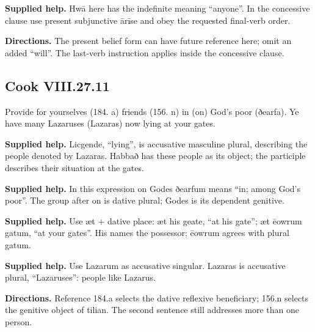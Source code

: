 \textbf{Supplied help.} Hwā here has the indefinite meaning “anyone”. In the concessive clause use present subjunctive ārīse and obey the requested final-verb order.

\textbf{Directions.} The present belief form can have future reference here; omit an added “will”. The last-verb instruction applies inside the concessive clause.

\par\begin{minipage}{\linewidth}\raggedright
\subsection*{Cook VIII.27.11}

Provide for yourselves (184. a) friends (156. n) in (on) God’s poor (ðearfa). Ye have many Lazaruses (Lazaras) now lying at your gates.

\end{minipage}\par\addvspace{4pt}

\textbf{Supplied help.} Licgende, “lying”, is accusative masculine plural, describing the people denoted by Lazaras. Habbað has these people as its object; the participle describes their situation at the gates.

\textbf{Supplied help.} In this expression on Godes ðearfum means “in; among God’s poor”. The group after on is dative plural; Godes is its dependent genitive.

\textbf{Supplied help.} Use æt + dative place: æt his geate, “at his gate”; æt ēowrum gatum, “at your gates”. His names the possessor; ēowrum agrees with plural gatum.

\textbf{Supplied help.} Use Lazarum as accusative singular. Lazaras is accusative plural, “Lazaruses”: people like Lazarus.

\textbf{Directions.} Reference 184.a selects the dative reflexive beneficiary; 156.n selects the genitive object of tilian. The second sentence still addresses more than one person.

